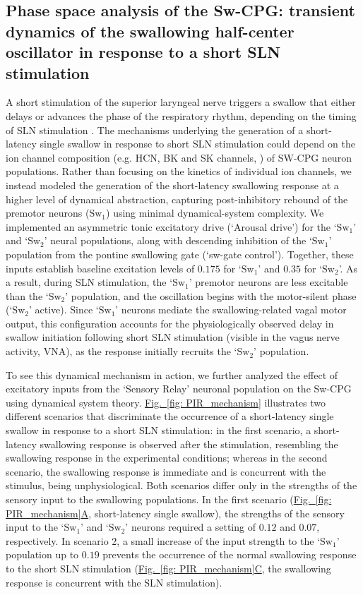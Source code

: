 \documentclass[pdflatex,sn-mathphys-ay]{sn-jnl}%
\renewcommand{\figureautorefname}{Fig.}
\newcommand{\Figref}[2][]{\hyperref[#2]{\figureautorefname~\ref*{#2}#1}}
\theoremstyle{thmstyleone}%
\theoremstyle{thmstyletwo}%
\theoremstyle{thmstylethree}%
\begin{document}
\subsection{Phase space analysis of the Sw-CPG: transient dynamics of the swallowing half-center oscillator in response to a short SLN stimulation}
A short stimulation of the superior laryngeal nerve triggers a swallow that either delays or advances the phase of the respiratory rhythm, depending on the timing of SLN stimulation \citep{lewis1990effects, oku1992phase}. The mechanisms underlying the generation of a short-latency single swallow in response to short SLN stimulation could depend on the ion channel composition (e.g. HCN, BK and SK channels, \citep{molineux2008ionic}) of SW-CPG neuron populations. Rather than focusing on the kinetics of individual ion channels, we instead modeled the generation of the short-latency swallowing response at a higher level of dynamical abstraction, capturing post-inhibitory rebound of the premotor neurons ($\text{Sw}_1$) using minimal dynamical-system complexity. We implemented an asymmetric tonic excitatory drive (`Arousal drive') for the `$\text{Sw}_1$' and `$\text{Sw}_2$' neural populations, along with descending inhibition of the `$\text{Sw}_1$' population from the pontine swallowing gate (`sw-gate control'). Together, these inputs establish baseline excitation levels of $0.175$ for `$\text{Sw}_1$' and $0.35$ for `$\text{Sw}_2$'. As a result, during SLN stimulation, the `$\text{Sw}_1$' premotor neurons are less excitable than the `$\text{Sw}_2$' population, and the oscillation begins with the motor-silent phase (`$\text{Sw}_2$' active). Since `$\text{Sw}_1$' neurons mediate the swallowing-related vagal motor output, this configuration accounts for the physiologically observed delay in swallow initiation following short SLN stimulation (visible in the vagus nerve activity, VNA), as the response initially recruits the `$\text{Sw}_2$' population.

To see this dynamical mechanism in action, we further analyzed the effect of excitatory inputs from the `Sensory Relay' neuronal population on the Sw-CPG using dynamical system theory. \Figref[]{fig: PIR_mechanism} illustrates two different scenarios that discriminate the occurrence of a short-latency single swallow in response to a short SLN stimulation: in the first scenario, a short-latency swallowing response is observed after the stimulation, resembling the swallowing response in the experimental conditions; whereas in the second scenario, the swallowing response is immediate and is concurrent with the stimulus, being unphysiological. 
Both scenarios differ only in the strengths of the sensory input to the swallowing populations. In the first scenario (\Figref[A]{fig: PIR_mechanism}, short-latency single swallow), the strengths of the sensory input to the `$\text{Sw}_1$' and `$\text{Sw}_2$' neurons required a setting of $0.12$ and $0.07$, respectively. In scenario 2, a small increase of the input strength to the `$\text{Sw}_1$' population up to $0.19$ prevents the occurrence of the normal swallowing response to the short SLN stimulation (\Figref[C]{fig: PIR_mechanism}, the swallowing response is concurrent with the SLN stimulation). 
\end{document}
